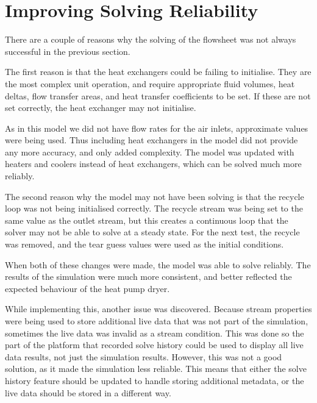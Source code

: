 
\chapter{Improving Solving Reliability} \label{sec:solvingreliability}


There are a couple of reasons why the solving of the flowsheet was not always successful in the previous section. 

The first reason is that the heat exchangers could be failing to initialise. They are the most complex unit operation, and require appropriate fluid volumes, heat deltas, flow transfer areas, and heat transfer coefficients to be set. If these are not set correctly, the heat exchanger may not initialise. 

As in this model we did not have flow rates for the air inlets, approximate values were being used. Thus including heat exchangers in the model did not provide any more accuracy, and only added complexity. The model was updated with heaters and coolers instead of heat exchangers, which can be solved much more reliably.

The second reason why the model may not have been solving is that the recycle loop was not being initialised correctly. The recycle stream was being set to the same value as the outlet stream, but this creates a continuous loop that the solver may not be able to solve at a steady state. For the next test, the recycle was removed, and the tear guess values were used as the initial conditions. 


When both of these changes were made, the model was able to solve reliably. The results of the simulation were much more consistent, and better reflected the expected behaviour of the heat pump dryer.


While implementing this, another issue was discovered. Because stream properties were being used to store additional live data that was not part of the simulation, sometimes the live data was invalid as a stream condition. This was done so the part of the platform that recorded solve history could be used to display all live data results, not just the simulation results. However, this was not a good solution, as it made the simulation less reliable. This means that either the solve history feature should be updated to handle storing additional metadata, or the live data should be stored in a different way.






